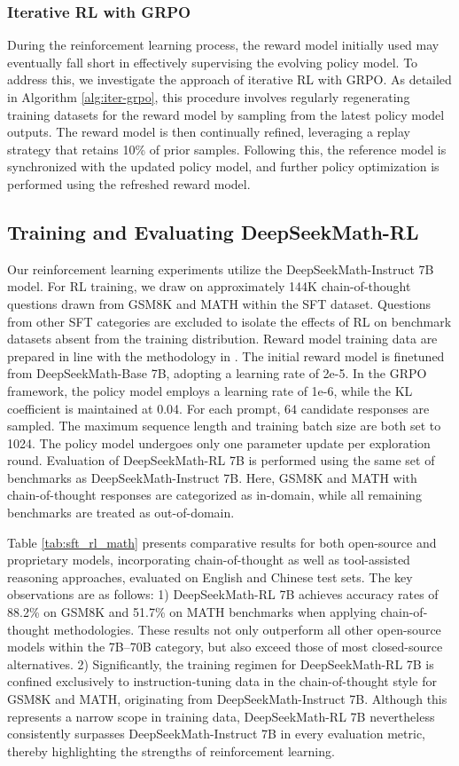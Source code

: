 {\subsubsection{Iterative RL with GRPO} During the reinforcement learning process, the reward model initially used may eventually fall short in effectively supervising the evolving policy model. To address this, we investigate the approach of iterative RL with GRPO. As detailed in Algorithm \ref{alg:iter-grpo}, this procedure involves regularly regenerating training datasets for the reward model by sampling from the latest policy model outputs. The reward model is then continually refined, leveraging a replay strategy that retains 10\% of prior samples. Following this, the reference model is synchronized with the updated policy model, and further policy optimization is performed using the refreshed reward model.

\subsection{Training and Evaluating DeepSeekMath-RL}

Our reinforcement learning experiments utilize the DeepSeekMath-Instruct 7B model. For RL training, we draw on approximately 144K chain-of-thought questions drawn from GSM8K and MATH within the SFT dataset. Questions from other SFT categories are excluded to isolate the effects of RL on benchmark datasets absent from the training distribution. Reward model training data are prepared in line with the methodology in \citep{wang2023math}. The initial reward model is finetuned from DeepSeekMath-Base 7B, adopting a learning rate of 2e-5. In the GRPO framework, the policy model employs a learning rate of 1e-6, while the KL coefficient is maintained at 0.04. For each prompt, $64$ candidate responses are sampled. The maximum sequence length and training batch size are both set to 1024. The policy model undergoes only one parameter update per exploration round. Evaluation of DeepSeekMath-RL 7B is performed using the same set of benchmarks as DeepSeekMath-Instruct 7B. Here, GSM8K and MATH with chain-of-thought responses are categorized as in-domain, while all remaining benchmarks are treated as out-of-domain.

Table \ref{tab:sft_rl_math} presents comparative results for both open-source and proprietary models, incorporating chain-of-thought as well as tool-assisted reasoning approaches, evaluated on English and Chinese test sets. The key observations are as follows: 1) DeepSeekMath-RL 7B achieves accuracy rates of 88.2\% on GSM8K and 51.7\% on MATH benchmarks when applying chain-of-thought methodologies. These results not only outperform all other open-source models within the 7B–70B category, but also exceed those of most closed-source alternatives. 2) Significantly, the training regimen for DeepSeekMath-RL 7B is confined exclusively to instruction-tuning data in the chain-of-thought style for GSM8K and MATH, originating from DeepSeekMath-Instruct 7B. Although this represents a narrow scope in training data, DeepSeekMath-RL 7B nevertheless consistently surpasses DeepSeekMath-Instruct 7B in every evaluation metric, thereby highlighting the strengths of reinforcement learning.

}
